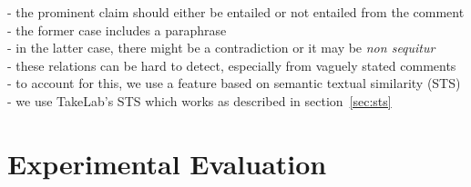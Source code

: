 - the prominent claim should either be entailed or not entailed from the comment \\
- the former case includes a paraphrase \\
- in the latter case, there might be a contradiction or it may be \textit{non sequitur} \\
- these relations can be hard to detect, especially from vaguely stated comments \\
- to account for this, we use a feature based on semantic textual similarity (STS) \\
- we use TakeLab's STS \citep{vsaric2012takelab} which works as described in
section~\ref{sec:sts} \\




\section{Experimental Evaluation}
